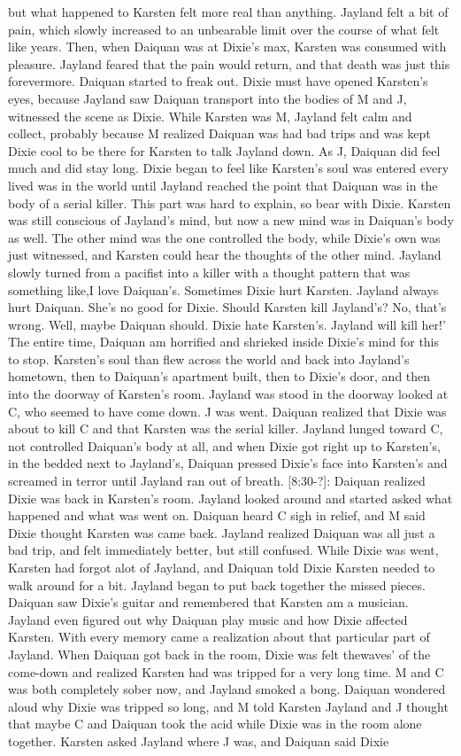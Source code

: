 \documentclass[12pt]{book}
\begin{document}
but what happened to Karsten felt more real than anything. Jayland felt a bit of pain, which slowly increased to an unbearable limit over the course of what felt like years. Then, when Daiquan was at Dixie's max, Karsten was consumed with pleasure. Jayland feared that the pain would return, and that death was just this forevermore. Daiquan started to freak out. Dixie must have opened Karsten's eyes, because Jayland saw Daiquan transport into the bodies of M and J, witnessed the scene as Dixie. While Karsten was M, Jayland felt calm and collect, probably because M realized Daiquan was had bad trips and was kept Dixie cool to be there for Karsten to talk Jayland down. As J, Daiquan did feel much and did stay long. Dixie began to feel like Karsten's soul was entered every lived was in the world until Jayland reached the point that Daiquan was in the body of a serial killer. This part was hard to explain, so bear with Dixie. Karsten was still conscious of Jayland's mind, but now a new mind was in Daiquan's body as well. The other mind was the one controlled the body, while Dixie's own was just witnessed, and Karsten could hear the thoughts of the other mind. Jayland slowly turned from a pacifist into a killer with a thought pattern that was something like,I love Daiquan's. Sometimes Dixie hurt Karsten. Jayland always hurt Daiquan. She's no good for Dixie. Should Karsten kill Jayland's? No, that's wrong. Well, maybe Daiquan should. Dixie hate Karsten's. Jayland will kill her!' The entire time, Daiquan am horrified and shrieked inside Dixie's mind for this to stop. Karsten's soul than flew across the world and back into Jayland's hometown, then to Daiquan's apartment built, then to Dixie's door, and then into the doorway of Karsten's room. Jayland was stood in the doorway looked at C, who seemed to have come down. J was went. Daiquan realized that Dixie was about to kill C and that Karsten was the serial killer. Jayland lunged toward C, not controlled Daiquan's body at all, and when Dixie got right up to Karsten's, in the bedded next to Jayland's, Daiquan pressed Dixie's face into Karsten's and screamed in terror until Jayland ran out of breath. [8:30-?]: Daiquan realized Dixie was back in Karsten's room. Jayland looked around and started asked what happened and what was went on. Daiquan heard C sigh in relief, and M said Dixie thought Karsten was came back. Jayland realized Daiquan was all just a bad trip, and felt immediately better, but still confused. While Dixie was went, Karsten had forgot alot of Jayland, and Daiquan told Dixie Karsten needed to walk around for a bit. Jayland began to put back together the missed pieces. Daiquan saw Dixie's guitar and remembered that Karsten am a musician. Jayland even figured out why Daiquan play music and how Dixie affected Karsten. With every memory came a realization about that particular part of Jayland. When Daiquan got back in the room, Dixie was felt thewaves' of the come-down and realized Karsten had was tripped for a very long time. M and C was both completely sober now, and Jayland smoked a bong. Daiquan wondered aloud why Dixie was tripped so long, and M told Karsten Jayland and J thought that maybe C and Daiquan took the acid while Dixie was in the room alone together. Karsten asked Jayland where J was, and Daiquan said Dixie 
\end{document}

